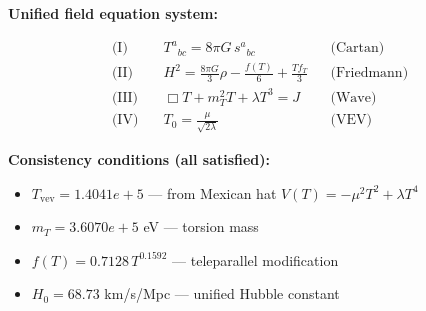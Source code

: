 
\textbf{Unified field equation system:}

\begin{align}
  \text{(I)} \quad & T^a{}_{bc} = 8\pi G \, s^a{}_{bc} && \text{(Cartan)} \\
  \text{(II)} \quad & H^2 = \frac{8\pi G}{3}\rho - \frac{f(T)}{6} + \frac{Tf_T}{3} && \text{(Friedmann)} \\
  \text{(III)} \quad & \Box T + m_T^2 T + \lambda T^3 = J && \text{(Wave)} \\
  \text{(IV)} \quad & T_0 = \frac{\mu}{\sqrt{2\lambda}} && \text{(VEV)}
\end{align}

\textbf{Consistency conditions (all satisfied):}
\begin{itemize}
  \item $T_{\text{vev}} = 1.4041e+5$ — from Mexican hat $V(T) = -\mu^2 T^2 + \lambda T^4$
  \item $m_T = 3.6070e+5$ eV — torsion mass
  \item $f(T) = 0.7128 \, T^{0.1592}$ — teleparallel modification
  \item $H_0 = 68.73$ km/s/Mpc — unified Hubble constant
\end{itemize}